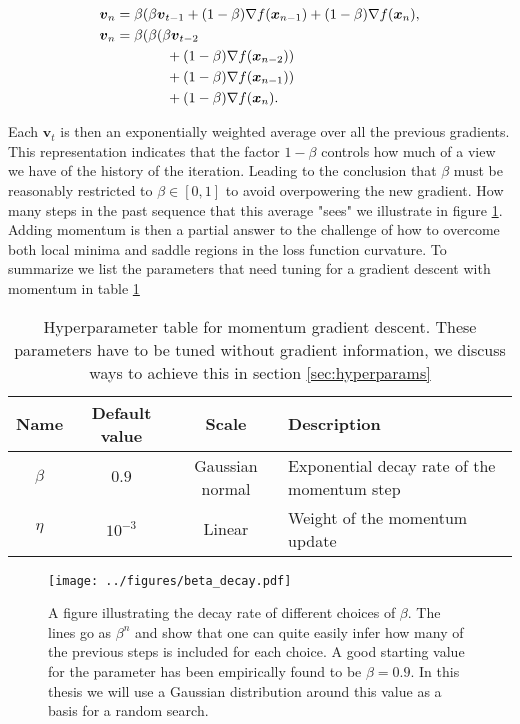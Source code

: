 \begin{align*}
\boldsymbol{v}_n &= \beta(\beta \boldsymbol{v}_{t-1} + (1-\beta)\nabla f(\boldsymbol{x}_{n-1})+ (1-\beta)\nabla f(\boldsymbol{x}_{n}), \\
\boldsymbol{v}_n &= \beta(\beta (\beta \boldsymbol{v}_{t-2} \\& \hspace{0.5in}+ (1-\beta)\nabla f(\boldsymbol{x}_{n-2})) \\
& \hspace{0.5in}+ (1-\beta)\nabla f(\boldsymbol{x}_{n-1})) \\
& \hspace{0.5in}+ (1-\beta)\nabla f(\boldsymbol{x}_{n}).
\end{align*}

\noindent Each $\boldsymbol{v}_t$ is then an exponentially weighted average over all the previous gradients. This representation indicates that the factor $1-\beta$ controls how much of a view we have of the history of the iteration. Leading to the conclusion that $\beta$ must be reasonably restricted to $\beta \in [0, 1]$ to avoid overpowering the new gradient. How many steps in the past sequence that this average "sees" we illustrate in figure \ref{fig:beta}. Adding momentum is then a partial answer to the challenge of how to overcome both local minima and saddle regions in the loss function curvature. To summarize we list the parameters that need tuning for a gradient descent with momentum in table \ref{tab:momentum}

\begin{table}
\centering
\caption{Hyperparameter table for momentum gradient descent. These parameters have to be tuned without gradient information, we discuss ways to achieve this in section \ref{sec:hyperparams}}\label{tab:momentum}
\begin{tabular}{cccl}
\toprule
Name &Default value & Scale  & Description\\
\midrule
$\beta$  & $0.9$ & Gaussian normal & Exponential decay rate of the momentum step\\
$\eta$  & $10^{-3}$ & Linear & Weight of the momentum update \\
\bottomrule
\end{tabular}
\end{table}


\begin{figure}
\centering
\texttt{[image: ../figures/beta\_decay.pdf]}
\caption[Exponential decay in momentum gradient descent]{A figure illustrating the decay rate of different choices of $\beta$. The lines go as $\beta^n$ and show that one can quite easily infer how many of the previous steps is included for each choice. A good starting value for the parameter has been empirically found to be $\beta=0.9$. In this thesis we will use a Gaussian distribution around this value as a basis for a random search.}\label{fig:beta}
\end{figure}

